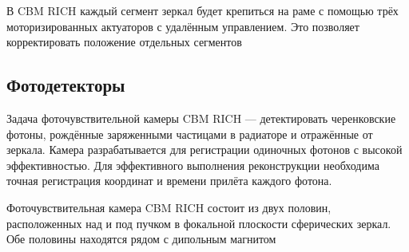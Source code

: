 В CBM RICH каждый сегмент зеркал будет крепиться на раме с помощью трёх \todo моторизированных актуаторов с удалённым управлением. Это позволяет корректировать положение отдельных сегментов 



\subsection{Фотодетекторы}

Задача фоточувствительной камеры CBM RICH --- детектировать черенковские фотоны, рождённые заряженными частицами в радиаторе и отражённые от зеркала. Камера разрабатывается для регистрации одиночных фотонов с высокой эффективностью. Для эффективного выполнения реконструкции необходима точная регистрация координат и времени прилёта каждого фотона.


Фоточувствительная камера CBM RICH состоит из двух половин, расположенных над и под пучком в фокальной плоскости сферических зеркал. Обе половины находятся рядом с дипольным магнитом



